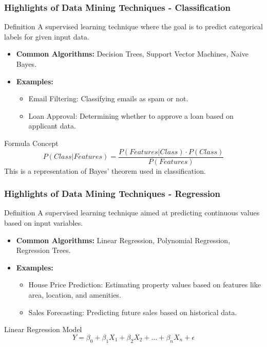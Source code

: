\documentclass[aspectratio=169]{beamer}
\begin{document}
\begin{frame}[fragile]
    \frametitle{Highlights of Data Mining Techniques - Classification}
    \begin{block}{Definition}
        A supervised learning technique where the goal is to predict categorical labels for given input data.
    \end{block}
    \begin{itemize}
        \item \textbf{Common Algorithms:} Decision Trees, Support Vector Machines, Naive Bayes.
        \item \textbf{Examples:}
        \begin{itemize}
            \item Email Filtering: Classifying emails as spam or not.
            \item Loan Approval: Determining whether to approve a loan based on applicant data.
        \end{itemize}
    \end{itemize}
    \begin{block}{Formula Concept}
        \begin{equation}
            P(Class | Features) = \frac{P(Features | Class) \cdot P(Class)}{P(Features)}
        \end{equation}
        This is a representation of Bayes' theorem used in classification.
    \end{block}
\end{frame}

\begin{frame}[fragile]
    \frametitle{Highlights of Data Mining Techniques - Regression}
    \begin{block}{Definition}
        A supervised learning technique aimed at predicting continuous values based on input variables.
    \end{block}
    \begin{itemize}
        \item \textbf{Common Algorithms:} Linear Regression, Polynomial Regression, Regression Trees.
        \item \textbf{Examples:}
        \begin{itemize}
            \item House Price Prediction: Estimating property values based on features like area, location, and amenities.
            \item Sales Forecasting: Predicting future sales based on historical data.
        \end{itemize}
    \end{itemize}
    \begin{block}{Linear Regression Model}
        \begin{equation}
            Y = \beta_0 + \beta_1X_1 + \beta_2X_2 + \ldots + \beta_nX_n + \epsilon 
        \end{equation}
    \end{block}
\end{frame}
\end{document}

